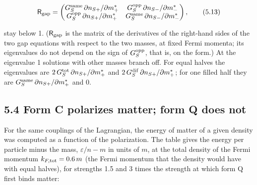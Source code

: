 \documentclass[
  10pt,
]{article}
\begin{document}
\[\mathsf R_{\rm gap}=\begin{pmatrix}G_S^{\rm same}\,\partial n_{S+}/\partial m^*_+&G_S^{\rm opp}\,\partial n_{S-}/\partial m^*_-\\
G_S^{\rm opp}\,\partial n_{S+}/\partial m^*_+&G_S^{\rm same}\,\partial n_{S-}/\partial m^*_-\end{pmatrix},\tag{5.13}\]

stay below 1. (\(\mathsf R_{\rm gap}\) is the matrix of the derivatives
of the right-hand sides of the two gap equations with respect to the two
masses, at fixed Fermi momenta; its eigenvalues do not depend on the
sign of \(G_S^{\rm opp}\), that is, on the form.) At the eigenvalue 1
solutions with other masses branch off. For equal halves the eigenvalues
are \(2\,G_S^{\rm tot}\,\partial n_{S+}/\partial m^*_+\) and
\(2\,G_S^{\rm dif}\,\partial n_{S+}/\partial m^*_+\); for one filled
half they are \(G_S^{\rm same}\,\partial n_{S+}/\partial m^*_+\) and
\(0\).

\hypertarget{form-c-polarizes-matter-form-q-does-not}{%
\subsection{5.4 Form C polarizes matter; form Q does
not}\label{form-c-polarizes-matter-form-q-does-not}}

For the same couplings of the Lagrangian, the energy of matter of a
given density was computed as a function of the polarization. The table
gives the energy per particle minus the mass, \(\varepsilon/n-m\) in
units of \(m\), at the total density of the Fermi momentum
\(k_{F,\rm tot}=0.6\,m\) (the Fermi momentum that the density would have
with equal halves), for strengths 1.5 and 3 times the strength at which
form Q first binds matter:
\end{document}

